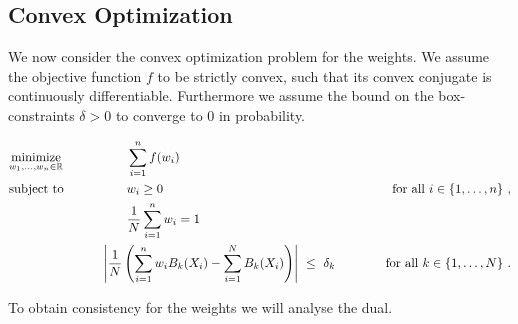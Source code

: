 \subsection*{Convex Optimization}

We now consider the convex optimization problem for the weights.
We assume the objective function $f$ to be strictly convex, such that its convex conjugate is continuously differentiable. Furthermore we 
assume the bound on the box-constraints $\delta>0$ to converge to $0$ in probability. 
\begin{fproblem}
  \label{bw:1:primal}
\begin{align*}
    &\underset{w_1, \ldots, w_n \in \R}
    {\text{minimize}}
    &&\qquad\qquad
    \sum_{i = 1}^{n} 
    f(w_i)
    &&&
    \\
    &\text{subject to}
    &&\qquad\qquad
    w_i 
    \ge
    0
    &&&
    \qquad
    \text{for all}\ 
    i \in \left\{ 1, \ldots, n \right\}
    \,,
    \\
    & 
    &&\qquad\qquad
    \frac{1}{N}
    \sum_{i=1}^{n} 
    w_i
    =1
    \\
    & 
    &&\qquad
    \left| 
      \frac{1}{N} 
      \left( 
      \sum_{i = 1}^{n} 
      w_i
      B_k(X_i)
      -
      \sum_{i=1}^{N} 
      B_k(X_i)
      \right)
    \right|
    \ 
    \le 
    \ 
    \delta_k
    &&&
    \qquad
    \text{for all}\ 
    k \in \left\{ 1, \ldots, N \right\}
    \,.
\end{align*}
\end{fproblem}
To obtain consistency for the weights we will analyse the dual.

